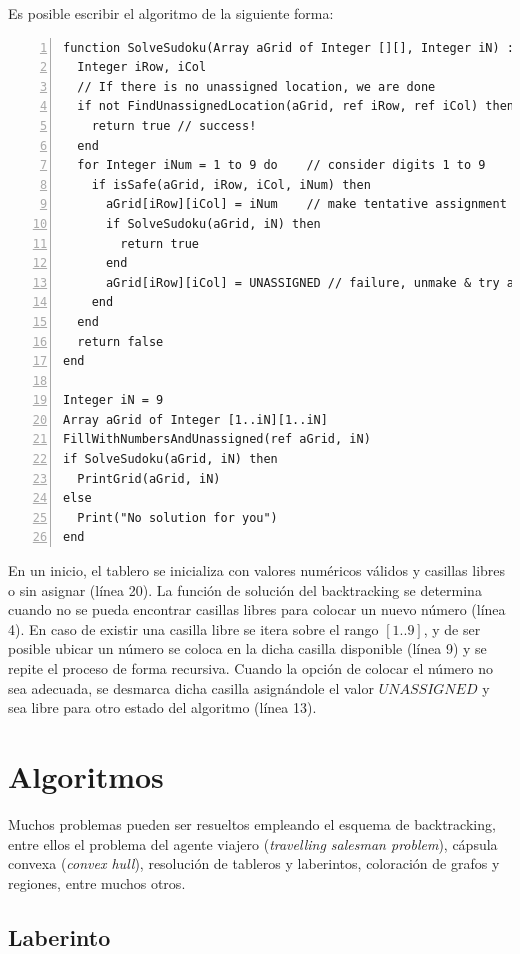 Es posible escribir el algoritmo de la siguiente forma:

\begin{lstlisting}[upquote=true, language=pseudo, numbers=left]
function SolveSudoku(Array aGrid of Integer [][], Integer iN) : Boolean
  Integer iRow, iCol
  // If there is no unassigned location, we are done
  if not FindUnassignedLocation(aGrid, ref iRow, ref iCol) then
    return true // success!
  end
  for Integer iNum = 1 to 9 do    // consider digits 1 to 9
    if isSafe(aGrid, iRow, iCol, iNum) then
      aGrid[iRow][iCol] = iNum    // make tentative assignment
      if SolveSudoku(aGrid, iN) then
        return true
      end
      aGrid[iRow][iCol] = UNASSIGNED // failure, unmake & try again
    end
  end
  return false
end

Integer iN = 9
Array aGrid of Integer [1..iN][1..iN]
FillWithNumbersAndUnassigned(ref aGrid, iN)
if SolveSudoku(aGrid, iN) then
  PrintGrid(aGrid, iN)
else
  Print("No solution for you")
end
\end{lstlisting}

En un inicio, el tablero se inicializa con valores numéricos válidos y casillas libres o sin asignar (línea 20). La función de solución del backtracking se determina cuando no se pueda encontrar casillas libres para colocar un nuevo número (línea 4). En caso de existir una casilla libre se itera sobre el rango $[1..9]$, y de ser posible ubicar un número se coloca en la dicha casilla disponible (línea 9) y se repite el proceso de forma recursiva. Cuando la opción de colocar el número no sea adecuada, se desmarca dicha casilla asignándole el valor $UNASSIGNED$ y sea libre para otro estado del algoritmo (línea 13).

\section{Algoritmos}

Muchos problemas pueden ser resueltos empleando el esquema de backtracking, entre ellos el problema del agente viajero (\textit{travelling salesman problem}), cápsula convexa (\textit{convex hull}), resolución de tableros y laberintos, coloración de grafos y regiones, entre muchos otros.

\subsection{Laberinto}

